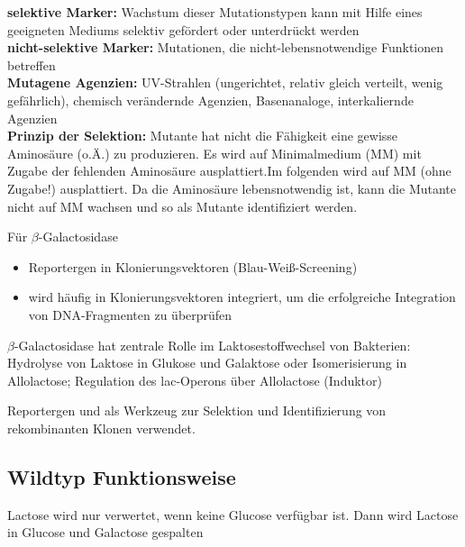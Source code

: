 \textbf{selektive Marker:} Wachstum dieser Mutationstypen kann mit Hilfe eines geeigneten Mediums selektiv gefördert oder unterdrückt werden\\
\textbf{nicht-selektive Marker:} Mutationen, die nicht-lebensnotwendige Funktionen betreffen\\

\textbf{Mutagene Agenzien:} UV-Strahlen (ungerichtet, relativ gleich verteilt, wenig gefährlich), chemisch verändernde Agenzien, Basenanaloge, interkaliernde Agenzien\\

\textbf{Prinzip der Selektion:} Mutante hat nicht die Fähigkeit eine gewisse Aminosäure (o.Ä.) zu produzieren. Es wird auf Minimalmedium (MM) mit Zugabe der fehlenden Aminosäure ausplattiert.Im folgenden wird auf MM (ohne Zugabe!) ausplattiert. Da die Aminosäure lebensnotwendig ist, kann die Mutante nicht auf MM wachsen und so als Mutante identifiziert werden.

\begin{mechanism}[title=Wofür codiert das lacZ-Gen?]
Für $\beta$-Galactosidase 
\end{mechanism}

\begin{mechanism}[title=Welchen Nutzen und welche Funktion hat das lacZ-Gen in der Genomik?]
\begin{itemize}
    \item Reportergen in Klonierungsvektoren (Blau-Weiß-Screening)
    \item wird häufig in Klonierungsvektoren integriert, um die erfolgreiche Integration von DNA-Fragmenten zu überprüfen
\end{itemize}
\end{mechanism}

\begin{mechanism}[title=Wofür ist das Produkt des lacZ-Gens verantwortlich? ]
$\beta$-Galactosidase hat zentrale Rolle im Laktosestoffwechsel von Bakterien: 
Hydrolyse von Laktose in Glukose und Galaktose oder Isomerisierung in Allolactose; Regulation des lac-Operons über Allolactose (Induktor)
\end{mechanism}

\begin{mechanism}[title=Wofür wird das lacZ in der Gentechnik verwendet?]
Reportergen und als Werkzeug zur Selektion und Identifizierung von rekombinanten Klonen verwendet.
\end{mechanism}

\subsection{Wildtyp Funktionsweise}
Lactose wird nur verwertet, wenn keine Glucose verfügbar ist. Dann wird Lactose in Glucose und Galactose gespalten

